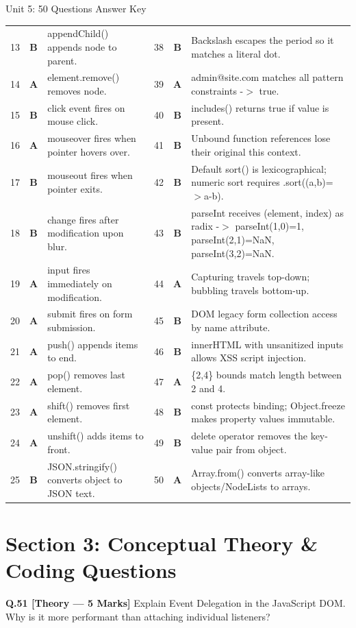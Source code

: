 \begin{answerkeytable}{Unit 5: 50 Questions Answer Key}
\begin{tabularx}{\textwidth}{l c X l c X}
13 & \textbf{B} & appendChild() appends node to parent. & 38 & \textbf{B} & Backslash escapes the period so it matches a literal dot. \\
14 & \textbf{A} & element.remove() removes node. & 39 & \textbf{A} & admin@site.com matches all pattern constraints -$>$ true. \\
15 & \textbf{B} & click event fires on mouse click. & 40 & \textbf{B} & includes() returns true if value is present. \\
16 & \textbf{A} & mouseover fires when pointer hovers over. & 41 & \textbf{B} & Unbound function references lose their original this context. \\
17 & \textbf{B} & mouseout fires when pointer exits. & 42 & \textbf{B} & Default sort() is lexicographical; numeric sort requires .sort((a,b)=$>$a-b). \\
18 & \textbf{B} & change fires after modification upon blur. & 43 & \textbf{B} & parseInt receives (element, index) as radix -$>$ parseInt(1,0)=1, parseInt(2,1)=NaN, parseInt(3,2)=NaN. \\
19 & \textbf{A} & input fires immediately on modification. & 44 & \textbf{A} & Capturing travels top-down; bubbling travels bottom-up. \\
20 & \textbf{A} & submit fires on form submission. & 45 & \textbf{B} & DOM legacy form collection access by name attribute. \\
21 & \textbf{A} & push() appends items to end. & 46 & \textbf{B} & innerHTML with unsanitized inputs allows XSS script injection. \\
22 & \textbf{A} & pop() removes last element. & 47 & \textbf{A} & \{2,4\} bounds match length between 2 and 4. \\
23 & \textbf{A} & shift() removes first element. & 48 & \textbf{B} & const protects binding; Object.freeze makes property values immutable. \\
24 & \textbf{A} & unshift() adds items to front. & 49 & \textbf{B} & delete operator removes the key-value pair from object. \\
25 & \textbf{B} & JSON.stringify() converts object to JSON text. & 50 & \textbf{A} & Array.from() converts array-like objects/NodeLists to arrays. \\
\bottomrule
\end{tabularx}
\end{answerkeytable}

\section{Section 3: Conceptual Theory \& Coding Questions}
\noindent\textbf{Q.51 [Theory --- 5 Marks]} Explain Event Delegation in the JavaScript DOM. Why is it more performant than attaching individual listeners?

